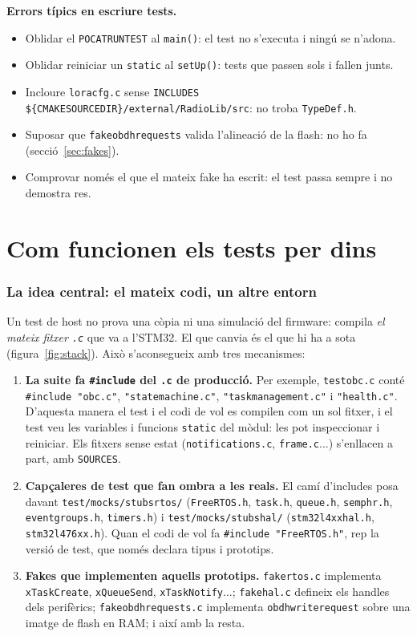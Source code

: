 \documentclass[11pt,a4paper]{article}
\DeclareRobustCommand{\_}{\textunderscore\allowbreak}
\newcommand{\cd}[1]{\texttt{#1}}
\begin{document}
\textbf{Errors típics en escriure tests.}
\begin{itemize}
\item Oblidar el \cd{POCAT\_RUN\_TEST} al \cd{main()}: el test no s'executa i ningú se n'adona.
\item Oblidar reiniciar un \cd{static} al \cd{setUp()}: tests que passen sols i fallen junts.
\item Incloure \cd{lora\_cfg.c} sense \cd{INCLUDES \$\{CMAKE\_SOURCE\_DIR\}/external/RadioLib/src}: no troba \cd{TypeDef.h}.
\item Suposar que \cd{fake\_obdh\_requests} valida l'alineació de la flash: no ho fa (secció~\ref{sec:fakes}).
\item Comprovar només el que el mateix fake ha escrit: el test passa sempre i no demostra res.
\end{itemize}
\part{Com funcionen els tests per dins}

\section{La idea central: el mateix codi, un altre entorn}\label{sec:idea}

Un test de host no prova una còpia ni una simulació del firmware: compila \emph{el mateix
fitxer \cd{.c}} que va a l'STM32. El que canvia és el que hi ha a sota
(figura~\ref{fig:stack}). Això s'aconsegueix amb tres mecanismes:

\begin{enumerate}
\item \textbf{La suite fa \cd{\#include} del \cd{.c} de producció.} Per exemple,
  \cd{test\_obc.c} conté \cd{\#include "obc.c"}, \cd{"state\_machine.c"},
  \cd{"task\_management.c"} i \cd{"health.c"}. D'aquesta manera el test i el codi de vol
  es compilen com un sol fitxer, i el test veu les variables i funcions \cd{static} del
  mòdul: les pot inspeccionar i reiniciar. Els fitxers sense estat (\cd{notifications.c},
  \cd{frame.c}...) s'enllacen a part, amb \cd{SOURCES}.
\item \textbf{Capçaleres de test que fan ombra a les reals.} El camí d'includes posa davant
  \cd{test/mocks/stubs\_rtos/} (\cd{FreeRTOS.h}, \cd{task.h}, \cd{queue.h}, \cd{semphr.h},
  \cd{event\_groups.h}, \cd{timers.h}) i \cd{test/mocks/stubs\_hal/} (\cd{stm32l4xx\_hal.h},
  \cd{stm32l476xx.h}). Quan el codi de vol fa \cd{\#include "FreeRTOS.h"}, rep la versió de
  test, que només declara tipus i prototips.
\item \textbf{Fakes que implementen aquells prototips.} \cd{fake\_rtos.c} implementa
  \cd{xTaskCreate}, \cd{xQueueSend}, \cd{xTaskNotify}...; \cd{fake\_hal.c} defineix els
  handles dels perifèrics; \cd{fake\_obdh\_requests.c} implementa \cd{obdh\_write\_request}
  sobre una imatge de flash en RAM; i així amb la resta.
\end{enumerate}
\end{document}
